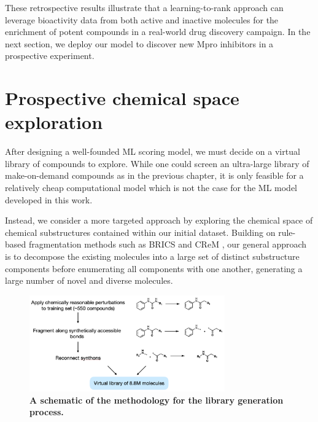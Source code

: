These retrospective results illustrate that a learning-to-rank approach can leverage bioactivity data from both active and inactive molecules for the enrichment of potent compounds in a real-world drug discovery campaign. In the next section, we deploy our model to discover new Mpro inhibitors in a prospective experiment.

\section{Prospective chemical space exploration}

After designing a well-founded ML scoring model, we must decide on a virtual library of compounds to explore. While one could screen an ultra-large library of make-on-demand compounds as in the previous chapter, it is only feasible for a relatively cheap computational model which is not the case for the ML model developed in this work. 

Instead, we consider a more targeted approach by exploring the chemical space of chemical substructures contained within our initial dataset. Building on rule-based fragmentation methods such as BRICS \cite{Degen2008brics} and CReM \cite{Polishchuk2020Crem}, our general approach is to decompose the existing molecules into a large set of distinct substructure components before enumerating all components with one another, generating a large number of novel and diverse molecules.

\begin{figure}[!th]
    \centering
        \includegraphics[width=0.75\textwidth]{Chapters/Ranking/Figs/library.png}
        \caption{\textbf{A schematic of the methodology for the library generation process.}}
        \label{fig:library}
\end{figure}

